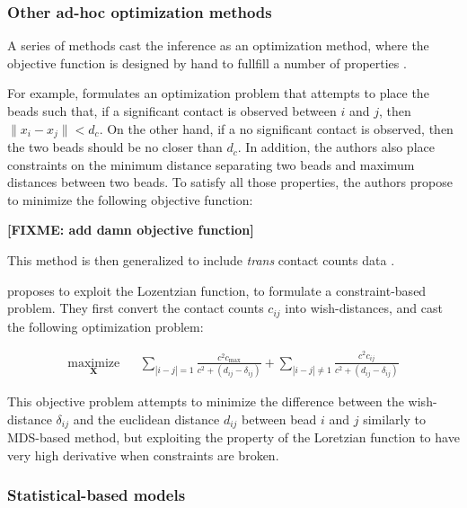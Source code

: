 \documentclass[letterpaper,12pt]{article}
\newcommand{\fixme}[1]{\textbf{[FIXME: #1]}}
\newcommand{\Xb}{\textbf{X}}
\begin{document}
\subsubsection*{Other ad-hoc optimization methods}

A series of methods cast the inference as an optimization method, where the
objective function is designed by hand to fullfill a number of properties
\citep{trieu:large, trieu:3D, trieu:MOGEN}.

For example, \citep{trieu:large} formulates an optimization problem that
attempts to place the beads such that, if a significant contact is observed
between $i$ and $j$, then $\| x_i - x_j \| < d_c$. On the other hand, if a
no significant contact is observed, then the two beads should be no closer
than $d_c$. In addition, the authors also place constraints on the minimum
distance separating two beads and maximum distances between two beads. To
satisfy all those properties, the authors propose to minimize the following
objective function:

\fixme{add damn objective function}

This method is then generalized to include \textit{trans} contact counts data
\citep{trieu:MOGEN}.

\cite{trieu:MOGEN} proposes to exploit the Lozentzian function, to formulate a
constraint-based problem. They first convert the contact counts $c_{ij}$ into
wish-distances, and cast the following optimization problem:

\begin{equation*}
\renewcommand{\arraystretch}{2}
\begin{array}{ccl}
\underset{\Xb}{\text{maximize}} & & \underset{| i - j | = 1}{\sum} \frac{c^2
c_\text{max}}{c^2 + (d_{ij} - \delta_{ij})} + 
\underset{| i - j | \neq 1}{\sum} \frac{c^2 c_{ij}}{c^2 + (d_{ij} - \delta_{ij})}
\end{array}
\end{equation*}

This objective problem attempts to minimize the difference between the
wish-distance $\delta_{ij}$ and the euclidean distance $d_{ij}$ between bead
$i$ and $j$ similarly to MDS-based method, but exploiting the property of the
Loretzian function to have very high derivative when constraints are broken.


\subsubsection*{Statistical-based models}
\end{document}
